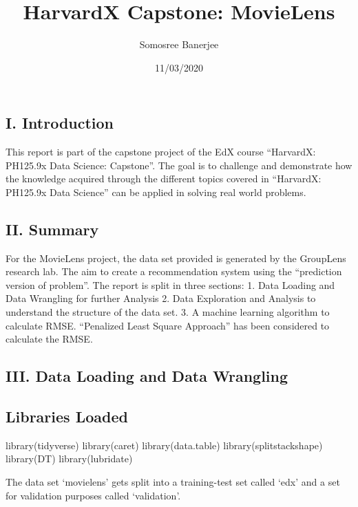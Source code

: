 \documentclass[
]{article}
\title{HarvardX Capstone: MovieLens}
\author{Somosree Banerjee}
\date{11/03/2020}
\begin{document}
\maketitle

{
\setcounter{tocdepth}{2}
\tableofcontents
}
\hypertarget{i.-introduction}{%
\subsection{I. Introduction}\label{i.-introduction}}

This report is part of the capstone project of the EdX course
``HarvardX: PH125.9x Data Science: Capstone''. The goal is to challenge
and demonstrate how the knowledge acquired through the different topics
covered in ``HarvardX: PH125.9x Data Science'' can be applied in solving
real world problems.

\hypertarget{ii.-summary}{%
\subsection{II. Summary}\label{ii.-summary}}

For the MovieLens project, the data set provided is generated by the
GroupLens research lab. The aim to create a recommendation system using
the ``prediction version of problem''. The report is split in three
sections: 1. Data Loading and Data Wrangling for further Analysis 2.
Data Exploration and Analysis to understand the structure of the data
set. 3. A machine learning algorithm to calculate RMSE. ``Penalized
Least Square Approach'' has been considered to calculate the RMSE.

\hypertarget{iii.-data-loading-and-data-wrangling}{%
\subsection{III. Data Loading and Data
Wrangling}\label{iii.-data-loading-and-data-wrangling}}

\hypertarget{libraries-loaded}{%
\subsection{Libraries Loaded}\label{libraries-loaded}}

library(tidyverse) library(caret) library(data.table)
library(splitstackshape) library(DT) library(lubridate)

The data set `movielens' gets split into a training-test set called
`edx' and a set for validation purposes called `validation'.
\end{document}
